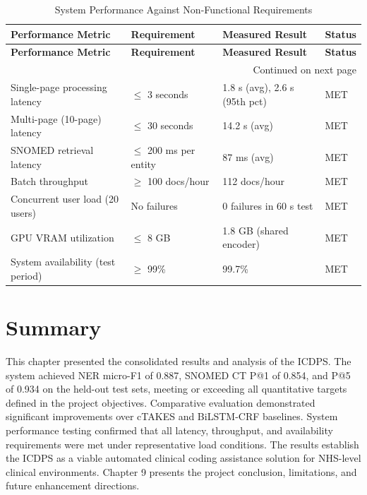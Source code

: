 \begin{longtable}{|p{4.5cm}|p{3cm}|p{3cm}|p{2cm}|}
\caption{System Performance Against Non-Functional Requirements}
\label{tab:nfr_performance}\\

\hline
\textbf{Performance Metric} &
\textbf{Requirement} &
\textbf{Measured Result} &
\textbf{Status} \\
\hline
\endfirsthead

\hline
\textbf{Performance Metric} &
\textbf{Requirement} &
\textbf{Measured Result} &
\textbf{Status} \\
\hline
\endhead

\hline
\multicolumn{4}{r}{Continued on next page} \\
\endfoot

\hline
\endlastfoot


Single-page processing latency &
$\leq$ 3 seconds &
1.8 s (avg), 2.6 s (95th pct) &
MET \\
\hline

Multi-page (10-page) latency &
$\leq$ 30 seconds &
14.2 s (avg) &
MET \\
\hline

SNOMED retrieval latency &
$\leq$ 200 ms per entity &
87 ms (avg) &
MET \\
\hline

Batch throughput &
$\geq$ 100 docs/hour &
112 docs/hour &
MET \\
\hline

Concurrent user load (20 users) &
No failures &
0 failures in 60 s test &
MET \\
\hline

GPU VRAM utilization &
$\leq$ 8 GB &
1.8 GB (shared encoder) &
MET \\
\hline

System availability (test period) &
$\geq$ 99\% &
99.7\% &
MET \\
\hline

\end{longtable}

\section*{Summary}

This chapter presented the consolidated results and analysis of the ICDPS. The system achieved NER micro-F1 of 0.887, SNOMED CT P@1 of 0.854, and P@5 of 0.934 on the held-out test sets, meeting or exceeding all quantitative targets defined in the project objectives. Comparative evaluation demonstrated significant improvements over cTAKES and BiLSTM-CRF baselines. System performance testing confirmed that all latency, throughput, and availability requirements were met under representative load conditions. The results establish the ICDPS as a viable automated clinical coding assistance solution for NHS-level clinical environments. Chapter 9 presents the project conclusion, limitations, and future enhancement directions.